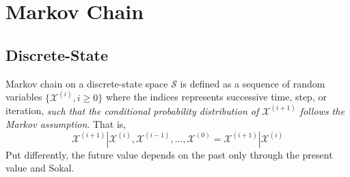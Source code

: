 \section{Markov Chain}\label{app:markov_chain}

\subsection{Discrete-State}\label{app:mc_discrete}

Markov chain on a discrete-state space $\mathcal{S}$ is defined as a sequence of random variables $\{\mathcal{X}^{(i)}, i \geq 0\}$ where the indices represents successive time, step, or iteration,
\emph{such that the conditional probability distribution of $\mathcal{X}^{(i+1)}$ follows the Markov assumption}.
That is,
\begin{equation}
  \mathcal{X}^{(i+1)} | \mathcal{X}^{(i)}, \mathcal{X}^{(i-1)}, \ldots, \mathcal{X}^{(0)} = \mathcal{X}^{(i+1)} | \mathcal{X}^{(i)}
\label{eq:markov_property}
\end{equation}
Put differently, the future value depends on the past only through the present value \cite{Geyer2011} and Sokal.

